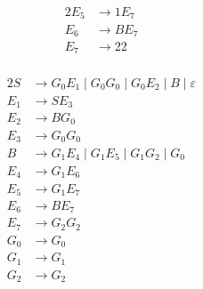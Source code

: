 {\begin{center}
\begin{minipage}[c]{0.3\textwidth}
\begin{alignat*}{2}
	E_5 &\rightarrow 1E_7 \\
	E_6 &\rightarrow BE_7\\
	E_7 &\rightarrow 22\\
\end{alignat*} \end{minipage}%
\begin{minipage}[c]{0.4\textwidth} \begin{alignat*}{2}
	S &\rightarrow G_0E_1\mid G_0G_0\mid G_0E_2\mid B\mid \varepsilon\\
	E_1 &\rightarrow SE_3\\
	E_2 &\rightarrow BG_0\\
	E_3 &\rightarrow G_0G_0\\
	B &\rightarrow G_1E_4\mid G_1E_5\mid G_1G_2\mid G_0\\
	E_4 &\rightarrow G_1E_6\\
	E_5 &\rightarrow G_1E_7 \\
	E_6 &\rightarrow BE_7\\
	E_7 &\rightarrow G_2G_2\\
	G_0 &\rightarrow G_0\\
	G_1 &\rightarrow G_1\\
	G_2 &\rightarrow G_2
\end{alignat*} \end{minipage}
\end{center}
}
